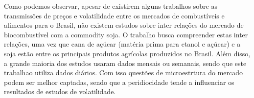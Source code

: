\documentclass[a4paper,12pt] {article}
\begin{document}
	Como podemos observar, apesar de existirem alguns trabalhos sobre as transmissões de preços e volatilidade entre os mercados de combustíveis e alimentos para o Brasil, não existem estudos sobre inter relações do mercado de biocombustível com a commodity soja. O trabalho busca compreender estas inter relações, uma vez que cana de açúcar (matéria prima para etanol e açúcar) e a soja estão entre os principais produtos agrícolas produzidos no Brasil. Além disso, a grande maioria dos estudos usaram dados mensais ou semanais, sendo que este trabalhao utiliza dados diários. Com isso questões de microestrtura do mercado podem ser melhor captadas, sendo que a peridiocidade tende a influenciar os resultados de estudos de volatilidade.
	
	
	

	
	
\end{document}
